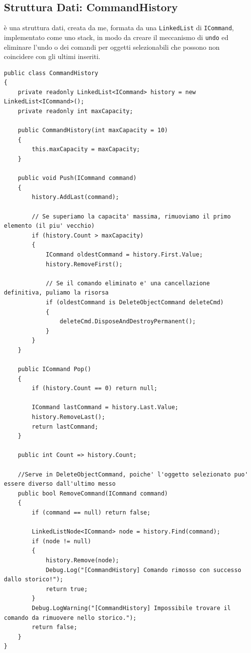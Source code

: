 \subsection{Struttura Dati: CommandHistory}
è una struttura dati, creata da me, formata da una \texttt{LinkedList} di \texttt{ICommand}, implementato come uno stack, in modo da creare il meccanismo di \texttt{undo} ed eliminare l'undo o dei comandi per oggetti selezionabili che possono non coincidere con gli ultimi inseriti. 
\begin{lstlisting}[language={[Sharp]C}]
public class CommandHistory
{
    private readonly LinkedList<ICommand> history = new LinkedList<ICommand>();
    private readonly int maxCapacity;

    public CommandHistory(int maxCapacity = 10)
    {
        this.maxCapacity = maxCapacity;
    }

    public void Push(ICommand command)
    {
        history.AddLast(command);

        // Se superiamo la capacita' massima, rimuoviamo il primo elemento (il piu' vecchio)
        if (history.Count > maxCapacity)
        {
            ICommand oldestCommand = history.First.Value;
            history.RemoveFirst();

            // Se il comando eliminato e' una cancellazione definitiva, puliamo la risorsa
            if (oldestCommand is DeleteObjectCommand deleteCmd)
            {
                deleteCmd.DisposeAndDestroyPermanent();
            }
        }
    }

    public ICommand Pop()
    {
        if (history.Count == 0) return null;

        ICommand lastCommand = history.Last.Value;
        history.RemoveLast();
        return lastCommand;
    }

    public int Count => history.Count;

    //Serve in DeleteObjectCommand, poiche' l'oggetto selezionato puo' essere diverso dall'ultimo messo
    public bool RemoveCommand(ICommand command)
    {
        if (command == null) return false;

        LinkedListNode<ICommand> node = history.Find(command);
        if (node != null)
        {
            history.Remove(node);
            Debug.Log("[CommandHistory] Comando rimosso con successo dallo storico!");
            return true;
        }
        Debug.LogWarning("[CommandHistory] Impossibile trovare il comando da rimuovere nello storico.");
        return false;
    }
}
\end{lstlisting}


